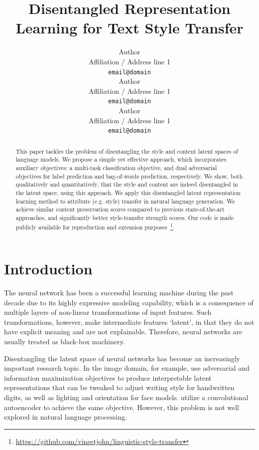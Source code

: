 \documentclass[11pt,a4paper]{article}
\title{Disentangled Representation Learning for Text Style Transfer}
\author{
	Author \\
	Affiliation / Address line 1 \\
	{\tt email@domain} \\
	\And
	Author \\
	Affiliation / Address line 1 \\
	{\tt email@domain} \\
	\And
	Author \\
	Affiliation / Address line 1 \\
	{\tt email@domain} \\
}
\date{}
\begin{document}
\maketitle

\graphicspath{{images/}}


\begin{abstract}
	This paper tackles the problem of disentangling the style and content latent spaces of language models. We propose a simple yet effective approach, which incorporates auxiliary objectives: a multi-task classification objective, and dual adversarial objectives for label prediction and bag-of-words prediction, respectively. We show, both qualitatively and quantitatively, that the style and content are indeed disentangled in the latent space, using this approach. We apply this disentangled latent representation learning method to attribute (e.g. style) transfer in natural language generation. We achieve similar content preservation scores compared to previous state-of-the-art approaches, and significantly better style-transfer strength scores. Our code is made publicly available for reproduction and extension purposes~\footnote{\url{https://github.com/vineetjohn/linguistic-style-transfer}}.
\end{abstract}

% 


\section{Introduction}

The neural network has been a successful learning machine during the past decade due to its highly expressive modeling capability, which is a consequence of multiple layers of non-linear transformations of input features. Such transformations, however, make intermediate features `latent', in that they do not have explicit meaning and are not explainable. Therefore, neural networks are usually treated as black-box machinery.

Disentangling the latent space of neural networks has become an increasingly important research topic. In the image domain, for example, \citet{chen2016infogan} use adversarial and information maximization objectives to produce interpretable latent representations that can be tweaked to adjust writing style for handwritten digits, as well as lighting and orientation for face models. \citet{mathieu2016disentangling} utilize a convolutional autoencoder to achieve the same objective. However, this problem is not well explored in natural language processing.
\end{document}
